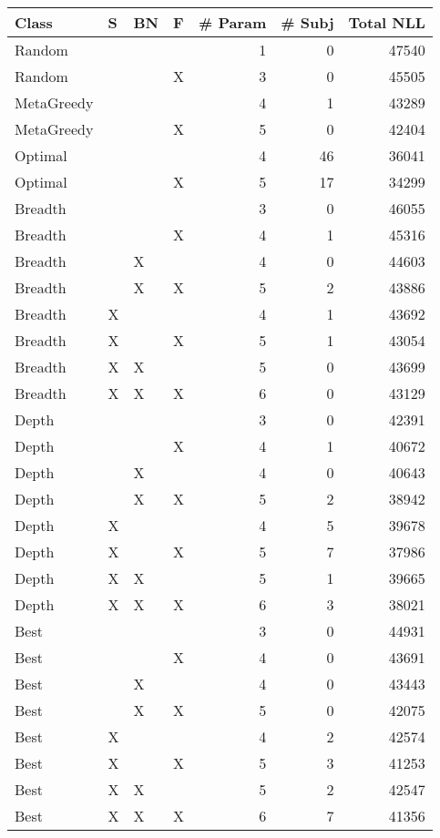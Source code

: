 \begin{tabular}{llllrrr}
\toprule
      Class &  S & BN &  F &  \# Param &  \# Subj &  Total NLL \\
\midrule
     Random &    &    &    &        1 &       0 &      47540 \\
     Random &    &    &  X &        3 &       0 &      45505 \\
 MetaGreedy &    &    &    &        4 &       1 &      43289 \\
 MetaGreedy &    &    &  X &        5 &       0 &      42404 \\
    Optimal &    &    &    &        4 &      46 &      36041 \\
    Optimal &    &    &  X &        5 &      17 &      34299 \\
    Breadth &    &    &    &        3 &       0 &      46055 \\
    Breadth &    &    &  X &        4 &       1 &      45316 \\
    Breadth &    &  X &    &        4 &       0 &      44603 \\
    Breadth &    &  X &  X &        5 &       2 &      43886 \\
    Breadth &  X &    &    &        4 &       1 &      43692 \\
    Breadth &  X &    &  X &        5 &       1 &      43054 \\
    Breadth &  X &  X &    &        5 &       0 &      43699 \\
    Breadth &  X &  X &  X &        6 &       0 &      43129 \\
      Depth &    &    &    &        3 &       0 &      42391 \\
      Depth &    &    &  X &        4 &       1 &      40672 \\
      Depth &    &  X &    &        4 &       0 &      40643 \\
      Depth &    &  X &  X &        5 &       2 &      38942 \\
      Depth &  X &    &    &        4 &       5 &      39678 \\
      Depth &  X &    &  X &        5 &       7 &      37986 \\
      Depth &  X &  X &    &        5 &       1 &      39665 \\
      Depth &  X &  X &  X &        6 &       3 &      38021 \\
       Best &    &    &    &        3 &       0 &      44931 \\
       Best &    &    &  X &        4 &       0 &      43691 \\
       Best &    &  X &    &        4 &       0 &      43443 \\
       Best &    &  X &  X &        5 &       0 &      42075 \\
       Best &  X &    &    &        4 &       2 &      42574 \\
       Best &  X &    &  X &        5 &       3 &      41253 \\
       Best &  X &  X &    &        5 &       2 &      42547 \\
       Best &  X &  X &  X &        6 &       7 &      41356 \\
\bottomrule
\end{tabular}
\unskip
